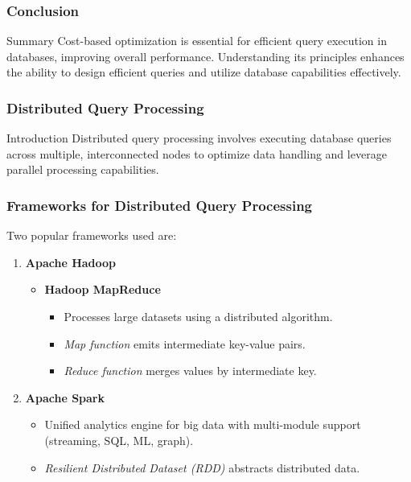 \documentclass[aspectratio=169]{beamer}
\begin{document}
\begin{frame}[fragile]
    \frametitle{Conclusion}
    
    \begin{block}{Summary}
        Cost-based optimization is essential for efficient query execution in databases, improving overall performance. Understanding its principles enhances the ability to design efficient queries and utilize database capabilities effectively.
    \end{block}
\end{frame}

\begin{frame}
    \frametitle{Distributed Query Processing}
    \begin{block}{Introduction}
        Distributed query processing involves executing database queries across multiple, interconnected nodes to optimize data handling and leverage parallel processing capabilities.
    \end{block}
\end{frame}

\begin{frame}
    \frametitle{Frameworks for Distributed Query Processing}
    Two popular frameworks used are:
    \begin{enumerate}
        \item \textbf{Apache Hadoop}
        \begin{itemize}
            \item \textbf{Hadoop MapReduce}
            \begin{itemize}
                \item Processes large datasets using a distributed algorithm.
                \item \textit{Map function} emits intermediate key-value pairs.
                \item \textit{Reduce function} merges values by intermediate key.
            \end{itemize}
        \end{itemize}
        \item \textbf{Apache Spark}
        \begin{itemize}
            \item Unified analytics engine for big data with multi-module support (streaming, SQL, ML, graph).
            \item \textit{Resilient Distributed Dataset (RDD)} abstracts distributed data.
        \end{itemize}
    \end{enumerate}
\end{frame}
\end{document}
